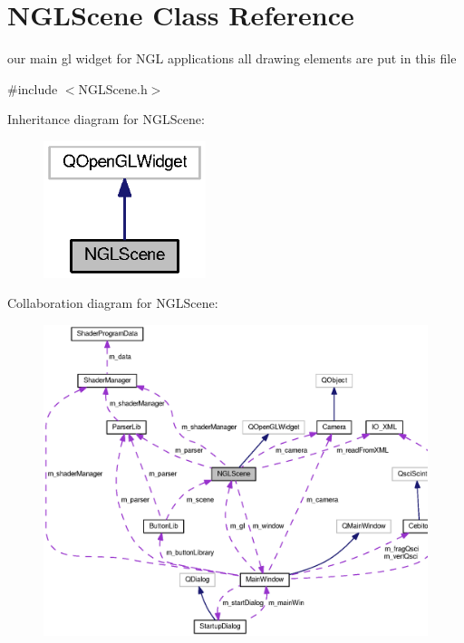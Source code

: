 \section{N\-G\-L\-Scene Class Reference}
\label{class_n_g_l_scene}


our main gl widget for N\-G\-L applications all drawing elements are put in this file  




{\ttfamily \#include $<$N\-G\-L\-Scene.\-h$>$}



Inheritance diagram for N\-G\-L\-Scene\-:\nopagebreak
\begin{figure}[H]
\begin{center}
\leavevmode
\includegraphics[width=134pt]{class_n_g_l_scene__inherit__graph}
\end{center}
\end{figure}


Collaboration diagram for N\-G\-L\-Scene\-:
\nopagebreak
\begin{figure}[H]
\begin{center}
\leavevmode
\includegraphics[width=350pt]{class_n_g_l_scene__coll__graph}
\end{center}
\end{figure}

